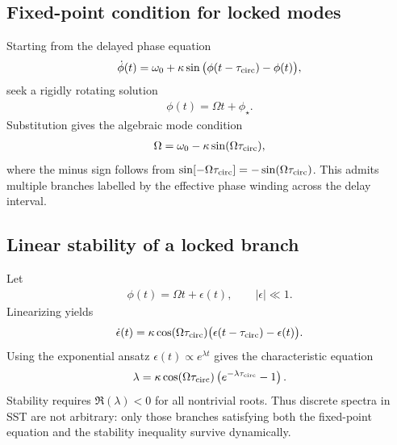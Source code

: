 \documentclass[11pt]{article}
\theoremstyle{definition}
\theoremstyle{plain}
\theoremstyle{remark}
\begin{document}
        \subsection{Fixed-point condition for locked modes}
            Starting from the delayed phase equation
            \begin{align}
                \dot{\phi}(t) = \omega_0 + \kappa \sin\big(\phi(t-\tau_{\rm circ})-\phi(t)\big),
            \end{align}
            seek a rigidly rotating solution
            \begin{align}
                \phi(t)=\Omega t + \phi_\star.
            \end{align}
            Substitution gives the algebraic mode condition
            \begin{align}
                \Omega = \omega_0 - \kappa \sin(\Omega\tau_{\rm circ}),
            \end{align}
            where the minus sign follows from $\sin[-\Omega\tau_{\rm circ}]=-\sin(\Omega\tau_{\rm circ})$. This admits multiple branches labelled by the effective phase winding across the delay interval.

        \subsection{Linear stability of a locked branch}
            Let
            \begin{align}
                \phi(t) = \Omega t + \epsilon(t),
                \qquad |\epsilon|\ll 1.
            \end{align}
            Linearizing yields
            \begin{align}
                \dot{\epsilon}(t)
                =
                \kappa \cos(\Omega\tau_{\rm circ})
                \big(\epsilon(t-\tau_{\rm circ})-\epsilon(t)\big).
            \end{align}
            Using the exponential ansatz $\epsilon(t)\propto e^{\lambda t}$ gives the characteristic equation
            \begin{align}
                \lambda
                =
                \kappa \cos(\Omega\tau_{\rm circ})
                \left(e^{-\lambda\tau_{\rm circ}}-1\right).
            \end{align}
            Stability requires $\Re(\lambda)<0$ for all nontrivial roots. Thus discrete spectra in SST are not arbitrary: only those branches satisfying both the fixed-point equation and the stability inequality survive dynamically.
\end{document}
